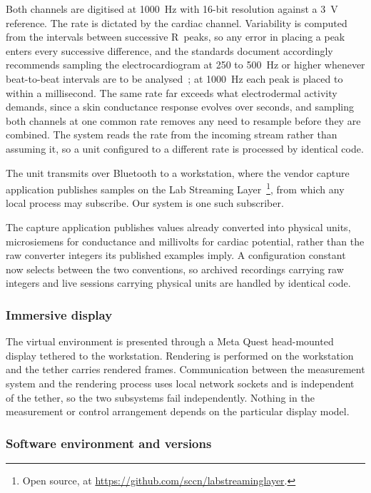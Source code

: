 Both channels are digitised at 1000~Hz with 16-bit resolution
against a 3~V reference. The rate is dictated by the cardiac
channel. Variability is computed from the intervals between
successive R~peaks, so any error in placing a peak enters every
successive difference, and the standards document accordingly
recommends sampling the electrocardiogram at 250 to 500~Hz or
higher whenever beat-to-beat intervals are to be
analysed~\citep{taskforce1996}; at 1000~Hz each peak is placed to
within a millisecond. The same rate far exceeds what electrodermal
activity demands, since a skin conductance response evolves over
seconds, and sampling both channels at one common rate removes any
need to resample before they are combined. The system reads the
rate from the incoming stream rather than assuming it, so a unit
configured to a different rate is processed by identical code.

The unit transmits over Bluetooth to a workstation,
where the vendor capture application publishes samples on the Lab
Streaming Layer~\citep{kothe2019}\footnote{Open source, at
\url{https://github.com/sccn/labstreaminglayer}.}, from which any
local process may subscribe. Our system is one such subscriber.

The capture application publishes values already
converted into physical units, microsiemens for conductance and
millivolts for cardiac potential, rather than the raw converter
integers its published examples imply. A configuration
constant now selects between the two conventions, so archived
recordings carrying raw integers and live sessions carrying
physical units are handled by identical code.

\subsubsection{Immersive display}
\label{sec:display}

The virtual environment is presented through a Meta Quest
head-mounted display tethered to the workstation. Rendering is
performed on the workstation and the tether carries rendered
frames. Communication between the measurement system and the
rendering process uses local network sockets and is independent
of the tether, so the two subsystems fail independently. Nothing
in the measurement or control arrangement depends on the
particular display model.

\subsubsection{Software environment and versions}
\label{sec:versions}

